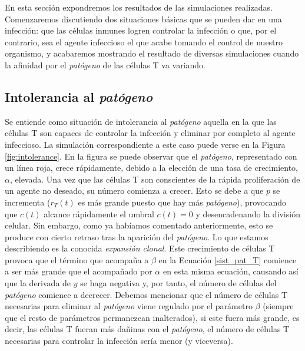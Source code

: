 En esta sección expondremos los resultados de las simulaciones realizadas. Comenzaremos discutiendo dos situaciones básicas que se pueden dar en una infección: que las células inmunes logren controlar la infección o que, por el contrario, sea el agente infeccioso el que acabe tomando el control de nuestro organismo, y acabaremos mostrando el resultado de diversas simulaciones cuando la afinidad por el \textit{patógeno} de las células T va variando.

\subsection{Intolerancia al \textit{patógeno}}
\label{sim:intoler}

Se entiende como situación de intolerancia al \textit{patógeno} aquella en la que las células T son capaces de controlar la infección y eliminar por completo al agente infeccioso. La simulación correspondiente a este caso puede verse en la Figura \ref{fig:intolerance}. En la figura se puede observar que el \textit{patógeno}, representado con un línea roja, crece rápidamente, debido a la elección de una tasa de crecimiento, $\alpha$, elevada. Una vez que las células T son conscientes de la rápida proliferación de un agente no deseado, su número comienza a crecer. Esto se debe a que $p$ se incrementa ($r_{T}(t)$ es más grande puesto que hay más \textit{patógeno}), provocando que $c(t)$ alcance rápidamente el umbral $c(t) = 0$ y desencadenando la división celular. Sin embargo, como ya habíamos comentado anteriormente, esto se produce con cierto retraso tras la aparición del \textit{patógeno}. Lo que estamos describiendo es la conocida \textit{expansión clonal}. Este crecimiento de células T provoca que el término que acompaña a $\beta$ en la Ecuación \ref{sist_pat_T} comience a ser más grande que el acompañado por $\alpha$ en esta misma ecuación, causando así que la derivada de $y$ se haga negativa y, por tanto, el número de células del \textit{patógeno} comience a decrecer. Debemos mencionar que el número de células T necesarias para eliminar al \textit{patógeno} viene regulado por el parámetro $\beta$ (siempre que el resto de parámetros permanezcan inalterados), si este fuera más grande, es decir, las células T fueran más dañinas con el \textit{patógeno}, el número de células T necesarias para controlar la infección sería menor (y viceversa).



